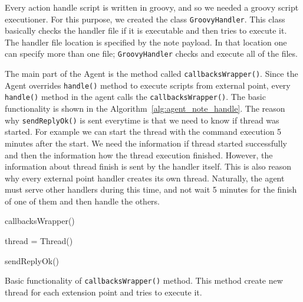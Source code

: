 Every action handle script is written in groovy, and so we needed a groovy script executioner. For this purpose, we created the class \texttt{GroovyHandler}. This class basically checks the handler file if it is executable and then tries to execute it. The handler file location is specified by the note payload. In that location one can specify more than one file; \texttt{GroovyHandler} checks and execute all of the files.

The main part of the Agent is the method called \texttt{callbacksWrapper()}. Since the Agent overrides \texttt{handle()} method to execute scripts from external point, every \texttt{handle()} method in the agent calls the \texttt{callbacksWrapper()}. The basic functionality is shown in the Algorithm~\ref{alg:agent_note_handle}. The reason why \texttt{sendReplyOk()} is sent everytime is that we need to know if thread was started. For example we can start the thread with the command execution 5 minutes after the start. We need the information if thread started successfully and then the information how the thread execution finished. However, the information about thread finish is sent by the handler itself. This is also reason why every external point handler creates its own thread. Naturally, the agent must serve other handlers during this time, and not wait 5 minutes for the finish of one of them and then handle the others.

\begin{center}
	\begin{algorithm}[H]
		\LinesNumbered
		\DontPrintSemicolon


		\fce callbacksWrapper()\;

		\var thread = Thread()\;


		sendReplyOk()\;

		 \caption{Basic functionality of \texttt{callbacksWrapper()} method. This method create new thread for each extension point and tries to execute it.}
		 \label{alg:agent_note_handle}
	\end{algorithm}
\end{center}

